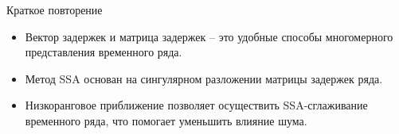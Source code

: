 
\usepackage{tikz}
\usepackage{amsmath}
\usepackage[english,russian]{babel}
\usepackage[labelformat=empty]{caption}

\usepackage{graphicx,animate}
\usepackage{animate}
\usepackage{svg}
\usepackage{subcaption}

\usetikzlibrary{arrows,shapes,positioning,shadows,trees}
\newcommand*{\defeq}{\stackrel{\text{def}}{=}}


\begin{frame}[plain]
\titlepage
\end{frame}
\begin{frame}{Краткое повторение}
\begin{itemize}
    \item Вектор задержек и матрица задержек -- это удобные способы многомерного представления временного ряда.
    \item Метод SSA основан на сингулярном разложении матрицы задержек ряда.
    \item Низкоранговое приближение позволяет осуществить SSA-сглаживание временного ряда, что помогает уменьшить влияние шума.
\end{itemize}
\end{frame}

